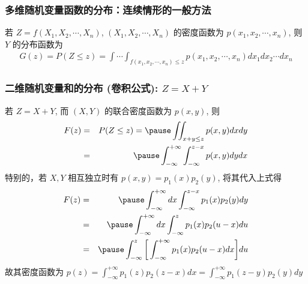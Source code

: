  \begin{frame}
 	\frametitle{多维随机变量函数的分布：连续情形的一般方法}
 	若 $Z=f (X_1,X_2,\cdots,X_n)$, $(X_1,X_2,\cdots,X_n)$ 的密度函数为 $p (x_1,x_2,\cdots,x_n)$, 则 $Y$ 的分布函数为
 	\begin{eqnarray*}
 		G(z)=P(Z\le z)=\int\cdots\int_{f(x_1,x_2,\cdots,x_n)\le z}p(x_1,x_2,\cdots,x_n)dx_1dx_2\cdots dx_n
 	\end{eqnarray*}

 \end{frame}
 \begin{frame}
 	\frametitle{二维随机变量和的分布 (卷积公式): $Z=X+Y$}
 	\begin{thm}
 		若 $Z=X+Y$, 而 $(X,Y)$ 的联合密度函数为 $p (x,y)$, 则
 		\begin{eqnarray*}
 			F(z)&=&P(Z\le z)=\pause \iint_{x+y\le z}p(x,y)dxdy\\
 			&=&\pause \int_{-\infty}^{+\infty}\int_{-\infty}^{z-x}p(x,y)dydx
 		\end{eqnarray*}
 		\pause 特别的，若 $X,Y$ 相互独立时有 $p (x,y)=p_1 (x) p_2 (y)$, 将其代入上式得 %
 		\pause \begin{eqnarray*}
 			F(z)&=&\pause \int_{-\infty}^{+\infty}dx\int_{-\infty}^{z-x}p_1(x)p_2(y)dy\\
 			&=& \pause  \int_{-\infty}^{+\infty}dx\int_{-\infty}^zp_1(x)p_2(u-x)du\\
 			&=& \pause  \int_{-\infty}^{z}\bigg[\int_{-\infty}^{+\infty}p_1(x)p_2(u-x)dx\bigg]du\\
 		\end{eqnarray*}
 		\pause 故其密度函数为 $p (z)=\int_{-\infty}^{+\infty} p_1 (z) p_2 (z-x) dx=\int_{-\infty}^{+\infty} p_1 (z-y) p_2 (y) dy$
 	\end{thm}
 \end{frame}
